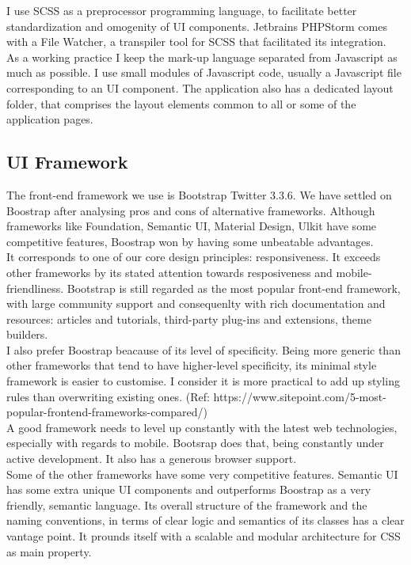 I use SCSS as a preprocessor programming language, to facilitate better standardization and omogenity of UI components. Jetbrains PHPStorm comes with a File Watcher, a transpiler tool for SCSS that facilitated its integration.\\

As a working practice I keep the mark-up language separated from Javascript as much as possible. I use small modules of Javascript code, usually a Javascript file corresponding to an UI component.
The application also has a dedicated layout folder, that comprises the layout elements common to all or some of the application pages. 

\subsection{UI Framework} 

The front-end framework we use is Bootstrap Twitter 3.3.6. We have settled on Boostrap after analysing pros and cons of alternative frameworks.
Although frameworks like Foundation, Semantic UI, Material Design, Ulkit have some competitive features, Boostrap won by having some unbeatable advantages.\\

It corresponds to one of our core design principles: responsiveness. It exceeds other frameworks by its stated attention towards resposiveness and mobile-friendliness.
Bootstrap is still regarded as the most popular front-end framework, with large community support and consequenlty with rich documentation and resources: articles and tutorials, third-party plug-ins and extensions, theme builders.\\

I also prefer Boostrap beacause of its level of specificity. Being more generic than other frameworks that tend to have higher-level specificity, its minimal style framework is easier to customise. I consider it is more practical to add up styling rules than overwriting existing ones. 
(Ref: https://www.sitepoint.com/5-most-popular-frontend-frameworks-compared/)\\

A good framework needs to level up constantly with the latest web technologies, especially with regards to mobile. Bootsrap does that, being constantly under active development. It also has a generous browser support.\\	

Some of the other frameworks have some very competitive features. Semantic UI has some extra unique UI components and outperforms Boostrap as a very friendly, semantic language. Its overall structure of the framework and the naming conventions, in terms of clear logic and semantics of its classes has a clear vantage point. It prounds itself with a scalable and modular architecture for CSS as main property.\\

